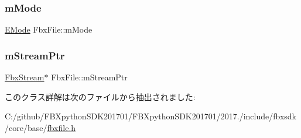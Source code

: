 \mbox{\label{class_fbx_file_ad9b7111817531ba69e1abddc7cc6d247}} 
\subsubsection{\texorpdfstring{m\+Mode}{mMode}}
{\footnotesize\ttfamily \hyperlink{class_fbx_file_a0370e8fd17b3658f718e1350a6a6f462}{E\+Mode} Fbx\+File\+::m\+Mode\hspace{0.3cm}{\ttfamily [protected]}}

\mbox{\label{class_fbx_file_ad2c5d8c4cc9284b848f2283af005325f}} 
\subsubsection{\texorpdfstring{m\+Stream\+Ptr}{mStreamPtr}}
{\footnotesize\ttfamily \hyperlink{class_fbx_stream}{Fbx\+Stream}$\ast$ Fbx\+File\+::m\+Stream\+Ptr\hspace{0.3cm}{\ttfamily [protected]}}



このクラス詳解は次のファイルから抽出されました\+:\begin{DoxyCompactItemize}
\item 
C\+:/github/\+F\+B\+Xpython\+S\+D\+K201701/\+F\+B\+Xpython\+S\+D\+K201701/2017./include/fbxsdk/core/base/\hyperlink{fbxfile_8h}{fbxfile.\+h}\end{DoxyCompactItemize}
